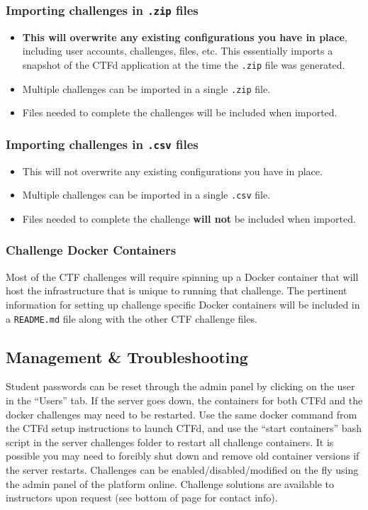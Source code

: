 \documentclass[11pt]{article}
\begin{document}
\subsubsection{Importing challenges in \texttt{.zip} files}

\begin{itemize}
   \item \textbf{This will overwrite any existing configurations you have in place}, including user accounts, challenges, files, etc. This essentially imports a snapshot of the CTFd application at the time the \texttt{.zip} file was generated.
   \item Multiple challenges can be imported in a single \texttt{.zip} file.
   \item Files needed to complete the challenges will be included when imported.
\end{itemize}

\subsubsection{Importing challenges in \texttt{.csv} files}

\begin{itemize}
   \item This will not overwrite any existing configurations you have in place.
   \item Multiple challenges can be imported in a single \texttt{.csv} file.
   \item Files needed to complete the challenge \textbf{will not} be included when imported.
\end{itemize}

\subsubsection{Challenge Docker Containers}

Most of the CTF challenges will require spinning up a Docker container that will host the infrastructure that is unique to running that challenge.
The pertinent information for setting up challenge specific Docker containers will be included in a \texttt{README.md} file along with the other CTF challenge files.

\subsection{Management \& Troubleshooting}

Student passwords can be reset through the admin panel by clicking on the user in the ``Users'' tab.
If the server goes down, the containers for both CTFd and the docker challenges may need to be restarted. Use the same docker command from the CTFd setup instructions to launch CTFd, and use the ``start containers'' bash script in the server challenges folder to restart all challenge containers.
It is possible you may need to forcibly shut down and remove old container versions if the server restarts.
Challenges can be enabled/disabled/modified on the fly using the admin panel of the platform online.
Challenge solutions are available to instructors upon request (see bottom of page for contact info).
\end{document}
